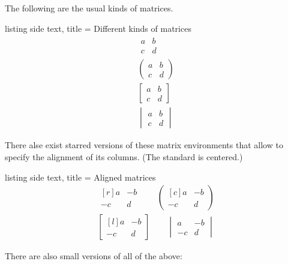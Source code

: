 \documentclass[a4paper, 10pt, headings=standardclasses, oneside, bibliography=totocnumbered]{scrbook}
\begin{document}
The following are the usual kinds of matrices.
\begin{tcblisting}{listing side text, title = {Different kinds of matrices}}
\begin{gather*}
  \begin{matrix}
    a & b \\
    c & d
  \end{matrix}
  \\
  \begin{pmatrix}
    a & b \\
    c & d
  \end{pmatrix}
  \\
  \begin{bmatrix}
    a & b \\
    c & d
  \end{bmatrix}
  \\
  \begin{vmatrix}
    a & b \\
    c & d
  \end{vmatrix}
\end{gather*}
\end{tcblisting}
There alse exist starred versions of these matrix environments that allow to specify the alignment of its columns.
(The standard is centered.)
\begin{tcblisting}{listing side text, title = {Aligned matrices}}
\begin{gather*}
  \begin{matrix*}[r]
      a & -b \\
     -c &  d
  \end{matrix*}
  \qquad
  \begin{pmatrix*}[c]
    a & -b \\
    -c &  d
  \end{pmatrix*}
\\
  \begin{bmatrix*}[l]
     a & -b \\
    -c &  d
  \end{bmatrix*}
  \qquad
  \begin{vmatrix}
     a & -b \\
    -c &  d
  \end{vmatrix}
\end{gather*}
\end{tcblisting}
There are also small versions of all of the above:
\end{document}
